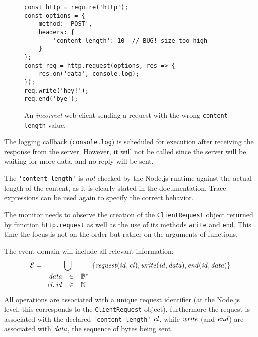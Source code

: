\begin{figure}[h]
\begin{lstlisting}
const http = require('http');
const options = {
	method: 'POST',
	headers: {
		'content-length': 10  // BUG! size too high
	}
};
const req = http.request(options, res => {
	res.on('data', console.log);
});
req.write('hey!');
req.end('bye');
\end{lstlisting}
\caption{An \emph{incorrect} web client sending a request with the wrong \texttt{content-length} value.}
\label{lst:client}
\end{figure}

The logging callback (\lstinline{console.log}) is scheduled for execution after receiving the response from the server.
However, it will not be called since the server will be waiting for more data, and no reply will be sent.

The \lstinline{'content-length'} is \emph{not} checked by the Node.js runtime against the actual length of the content, as it is clearly stated in the documentation.
Trace expressions can be used again to specify the correct behavior.

The monitor needs to observe the creation of the \lstinline{ClientRequest} object returned by function \lstinline{http.request} as well as the use of its methods \lstinline{write} and \lstinline{end}.
This time the focus is not on the order but rather on the arguments of functions.

The event domain will include all relevant information:
\[ \mathcal{E} = \bigcup_{\begin{array}{rcl}\mathit{data}&\in&\mathbb{B}^*\\\mathit{cl},\mathit{id} &\in& \mathbb{N}\end{array}} \{ \mathit{request}(\mathit{id},\mathit{cl}), \mathit{write}(\mathit{id}, \mathit{data}), \mathit{end}(\mathit{id}, \mathit{data}) \} \]
All operations are associated with a unique request identifier (at the Node.js level, this corresponds to the \lstinline{ClientRequest} object), furthermore the request is associated with the declared \lstinline{'content-length'} \(\mathit{cl}\), while \(\mathit{write}\) (and \(\mathit{end}\)) are associated with \(\mathit{data}\),
the sequence of bytes being sent.



